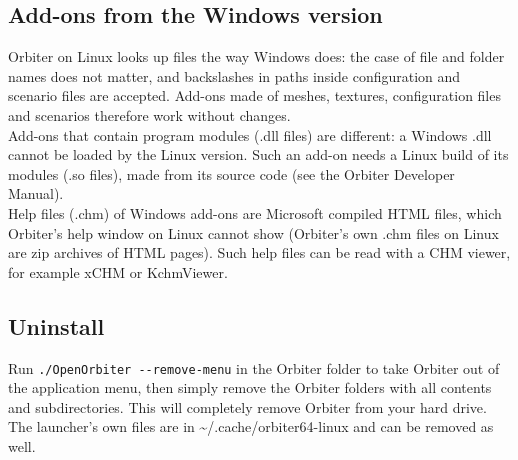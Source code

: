\documentclass[Orbiter User Manual.tex]{subfiles}
\begin{document}
\noindent
{}

\subsection{Add-ons from the Windows version}
Orbiter on Linux looks up files the way Windows does: the case of file and folder names does not matter, and backslashes in paths inside configuration and scenario files are accepted. Add-ons made of meshes, textures, configuration files and scenarios therefore work without changes.\\
Add-ons that contain program modules (.dll files) are different: a Windows .dll cannot be loaded by the Linux version. Such an add-on needs a Linux build of its modules (.so files), made from its source code (see the Orbiter Developer Manual).\\
Help files (.chm) of Windows add-ons are Microsoft compiled HTML files, which Orbiter's help window on Linux cannot show (Orbiter's own .chm files on Linux are zip archives of HTML pages). Such help files can be read with a CHM viewer, for example xCHM or KchmViewer.

\subsection{Uninstall}
Run \texttt{./OpenOrbiter -{}-remove-menu} in the Orbiter folder to take Orbiter out of the application menu, then simply remove the Orbiter folders with all contents and subdirectories. This will completely remove Orbiter from your hard drive. The launcher's own files are in \textasciitilde/.cache/orbiter64-linux and can be removed as well.
\end{document}

